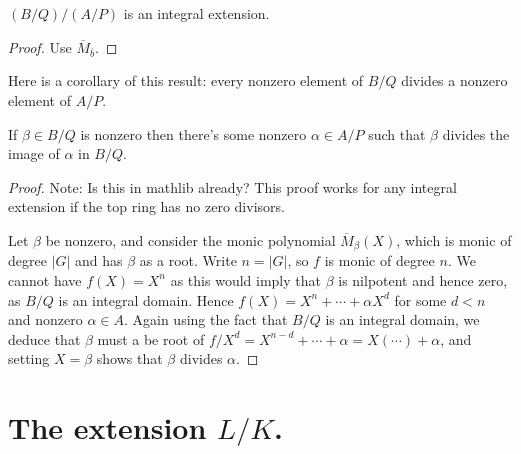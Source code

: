 \begin{theorem}
  \label{MulSemiringAction.reduction_isIntegral}
  \leanok
  $(B/Q)/(A/P)$ is an integral extension.
\end{theorem}
\begin{proof}
  Use $\overline{M}_{\overline{b}}$.
\end{proof}

Here is a corollary of this result: every nonzero element of $B/Q$ divides
a nonzero element of $A/P$.
\begin{corollary}
  \label{Algebra.exists_dvd_nonzero_if_isIntegral}
  \leanok
  If $\beta\in B/Q$ is nonzero then there's some nonzero $\alpha\in A/P$
  such that $\beta$ divides the image of $\alpha$ in $B/Q$.
\end{corollary}
\begin{proof}
  Note: Is this in mathlib already? This proof works for any
  integral extension if the top ring has no zero divisors.

  Let $\beta$ be nonzero, and
  consider the monic polynomial $\overline{M}_\beta(X)$, which is monic of
  degree $|G|$ and has $\beta$ as a root. Write $n=|G|$, so $f$ is monic
  of degree $n$. We cannot have $f(X)=X^n$ as this would imply that $\beta$ is
  nilpotent and hence zero, as $B/Q$ is an integral domain. Hence $f(X)=X^n+\cdots +\alpha X^d$
  for some $d<n$ and nonzero $\alpha\in A$. Again using the fact that $B/Q$ is an integral domain, we
  deduce that $\beta$ must a be root of $f/X^d=X^{n-d}+\cdots+\alpha=X(\cdots)+\alpha$, and setting
  $X=\beta$ shows that $\beta$ divides $\alpha$.
\end{proof}

\section{The extension \texorpdfstring{$L/K$}{L/K}.}

